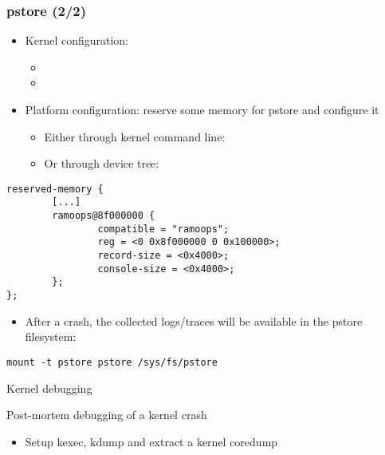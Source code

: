 \begin{frame}[fragile]
  \frametitle{pstore (2/2)}
	\begin{itemize}
    \item Kernel configuration:
      \begin{itemize}
        \item {}
        \item {}
      \end{itemize}
	\item Platform configuration: reserve some memory for pstore and
    configure it
    \begin{itemize}
      \item Either through kernel command line:
      \item Or through device tree:
    \end{itemize}
  \end{itemize}
  \begin{block}{}
    \begin{verbatim}
reserved-memory {
        [...]
        ramoops@8f000000 {
                compatible = "ramoops";
                reg = <0 0x8f000000 0 0x100000>;
                record-size = <0x4000>;
                console-size = <0x4000>;
        };
};
    \end{verbatim}
  \end{block}
  \begin{itemize}
    \item After a crash, the collected logs/traces will be available in the
      pstore filesystem:
  \end{itemize}
  \begin{block}{}
    \begin{verbatim}
mount -t pstore pstore /sys/fs/pstore
    \end{verbatim}
  \end{block}
\end{frame}

\setuplabframe
{Kernel debugging}
{
  Post-mortem debugging of a kernel crash
  \begin{itemize}
    \item Setup kexec, kdump and extract a kernel coredump
  \end{itemize}
}
